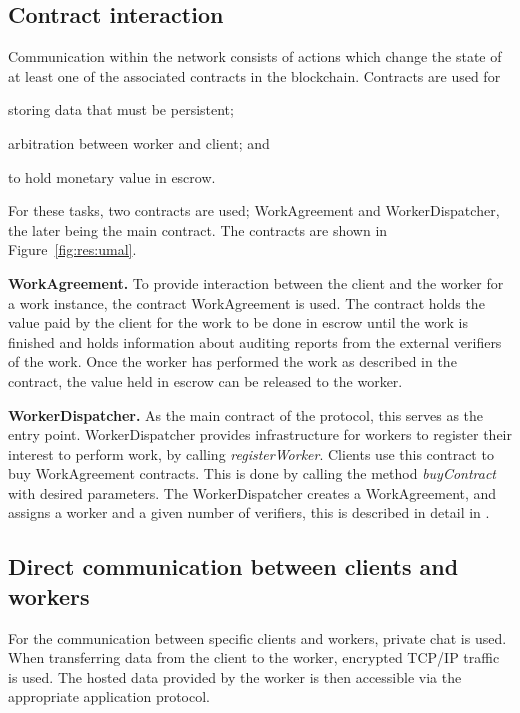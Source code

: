 \subsection{Contract interaction}
\label{sec:res:contract}
Communication within the network consists of actions which change the state of at least one of the associated contracts in the blockchain. Contracts are used for
\begin{inparaenum}
\item storing data that must be persistent;
\item arbitration between worker and client; and
\item to hold monetary value in escrow.
\end{inparaenum}
For these tasks, two contracts are used; WorkAgreement and WorkerDispatcher, the later being the main contract. The contracts are shown in Figure~\ref{fig:res:umal}.

\textbf{WorkAgreement.} To provide interaction between the client and the worker for a work instance, the contract WorkAgreement is used. The contract holds the value paid by the client for the work to be done in escrow until the work is finished and holds information about auditing reports from the external verifiers of the work. Once the worker has performed the work as described in the contract, the value held in escrow can be released to the worker.

\textbf{WorkerDispatcher.} As the main contract of the protocol, this serves as the entry point. WorkerDispatcher provides infrastructure for workers to register their interest to perform work, by calling \textit{registerWorker}. Clients use this contract to buy WorkAgreement contracts. This is done by calling the method \textit{buyContract} with desired parameters. The WorkerDispatcher creates a WorkAgreement, and assigns a worker and a given number of verifiers, this is described in detail in .

\subsection{Direct communication between clients and workers}
\label{sec:res:communication}
For the communication between specific clients and workers, private chat is used. When transferring data from the client to the worker, encrypted TCP/IP traffic is used. The hosted data provided by the worker is then accessible via the appropriate application protocol.

